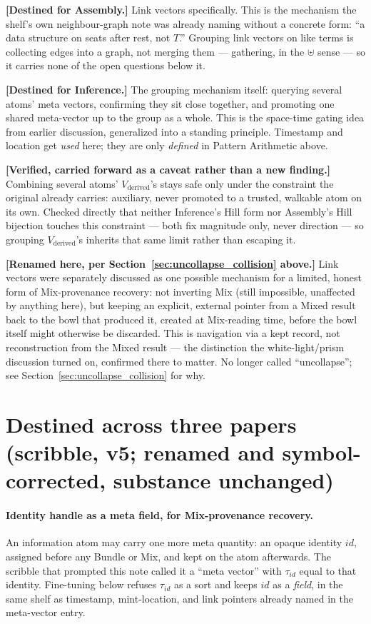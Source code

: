 \documentclass[11pt]{article}
\begin{document}
\textbf{[Destined for Assembly.]} Link vectors specifically. This is
the mechanism the shelf's own neighbour-graph note was already naming
without a concrete form: ``a data structure on seats after rest, not
$T$.'' Grouping link vectors on like terms is collecting edges into a
graph, not merging them --- gathering, in the $\uplus$ sense --- so
it carries none of the open questions below it.

\textbf{[Destined for Inference.]} The grouping mechanism itself:
querying several atoms' meta vectors, confirming they sit close
together, and promoting one shared meta-vector up to the group as a
whole. This is the space-time gating idea from earlier discussion,
generalized into a standing principle. Timestamp and location get
\emph{used} here; they are only \emph{defined} in Pattern Arithmetic
above.

\textbf{[Verified, carried forward as a caveat rather than a new
finding.]} Combining several atoms' $V_{\text{derived}}$'s stays safe
only under the constraint the original already carries: auxiliary,
never promoted to a trusted, walkable atom on its own. Checked
directly that neither Inference's Hill form nor Assembly's Hill
bijection touches this constraint --- both fix magnitude only, never
direction --- so grouping $V_{\text{derived}}$'s inherits that same
limit rather than escaping it.

\textbf{[Renamed here, per Section~\ref{sec:uncollapse_collision}
above.]} Link vectors were separately discussed as one possible
mechanism for a limited, honest form of Mix-provenance recovery: not
inverting Mix (still impossible, unaffected by anything here), but
keeping an explicit, external pointer from a Mixed result back to the
bowl that produced it, created at Mix-reading time, before the bowl
itself might otherwise be discarded. This is navigation via a kept
record, not reconstruction from the Mixed result --- the distinction
the white-light/prism discussion turned on, confirmed there to
matter. No longer called ``uncollapse''; see
Section~\ref{sec:uncollapse_collision} for why.

\section{Destined across three papers (scribble, v5; renamed and
symbol-corrected, substance unchanged)}

\paragraph{Identity handle as a meta field, for Mix-provenance
recovery.}
An information atom may carry one more meta quantity: an opaque
identity $id$, assigned before any Bundle or Mix, and kept on the
atom afterwards. The scribble that prompted this note called it a
``meta vector'' with $\tau_{id}$ equal to that identity. Fine-tuning
below refuses $\tau_{id}$ as a sort and keeps $id$ as a \emph{field},
in the same shelf as timestamp, mint-location, and link pointers
already named in the meta-vector entry.
\end{document}
